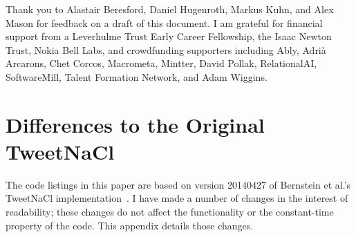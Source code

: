 \documentclass[manuscript]{acmart}
\begin{document}




\begin{acks}
Thank you to Alastair Beresford, Daniel Hugenroth, Markus Kuhn, and Alex Mason for feedback on a draft of this document.
I am grateful for financial support from a Leverhulme Trust Early Career Fellowship, the Isaac Newton Trust, Nokia Bell Labs, and crowdfunding supporters including Ably, Adri{\` a} Arcarons, Chet Corcos, Macrometa, Mintter, David Pollak, RelationalAI, SoftwareMill, Talent Formation Network, and Adam Wiggins.
\end{acks}




\appendix
\section{Differences to the Original TweetNaCl}\label{sec:appendix}

The code listings in this paper are based on version 20140427 of Bernstein et al.'s TweetNaCl implementation~\cite{TweetNaCl}.
I have made a number of changes in the interest of readability; these changes do not affect the functionality or the constant-time property of the code.
This appendix details those changes.
\end{document}
